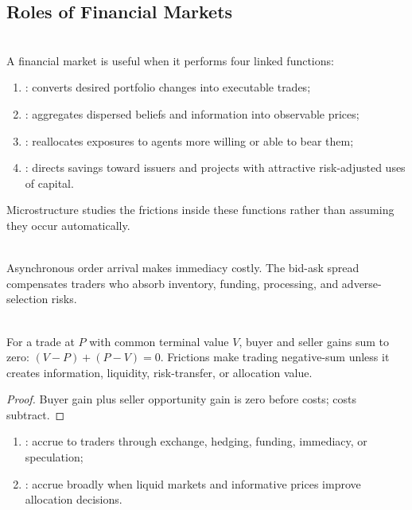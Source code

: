 \subsection{Roles of Financial Markets}

\begin{principle} \\
A financial market is useful when it performs four linked functions:
\begin{enumerate}[label=\roman*.]
\setlength{\itemsep}{0pt}
\item {}: converts desired portfolio changes into executable trades;
\item {}: aggregates dispersed beliefs and information into observable prices;
\item {}: reallocates exposures to agents more willing or able to bear them;
\item {}: directs savings toward issuers and projects with attractive risk-adjusted uses of capital.
\end{enumerate}
Microstructure studies the frictions inside these functions rather than assuming they occur automatically.
\end{principle}

\begin{principle} \\
Asynchronous order arrival makes immediacy costly. The bid-ask spread compensates traders who absorb inventory, funding, processing, and adverse-selection risks.
\end{principle}

\begin{proposition} \\
For a trade at $P$ with common terminal value $V$, buyer and seller gains sum to zero: $(V-P)+(P-V)=0$. Frictions make trading negative-sum unless it creates information, liquidity, risk-transfer, or allocation value.
\begin{proof}
Buyer gain plus seller opportunity gain is zero before costs; costs subtract.
\end{proof}
\end{proposition}

\begin{taxonomy} 
\begin{enumerate}[label=\roman*.]
\setlength{\itemsep}{0pt}
\item {}: accrue to traders through exchange, hedging, funding, immediacy, or speculation;
\item {}: accrue broadly when liquid markets and informative prices improve allocation decisions.
\end{enumerate}
\end{taxonomy}


